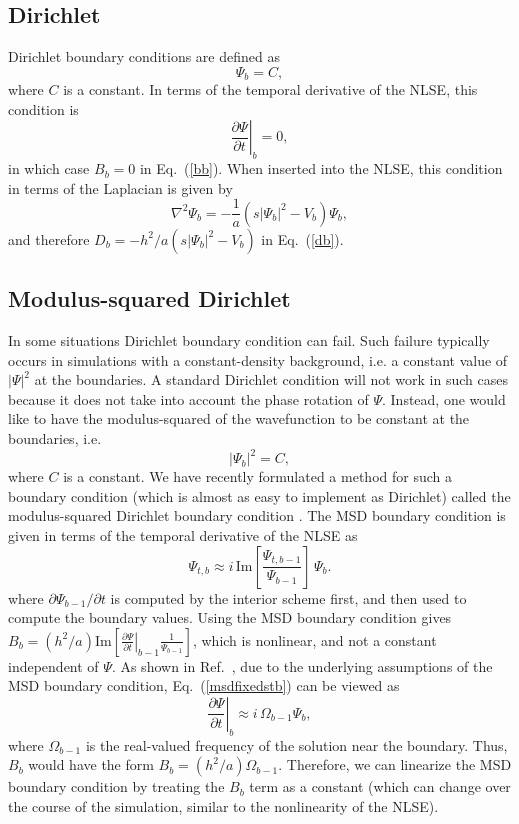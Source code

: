 \documentclass{article}
\begin{document}
\subsection{Dirichlet}
Dirichlet boundary conditions are defined as
\[
\Psi_b = C,
\]
where $C$ is a constant.  In terms of the temporal derivative of the NLSE, this condition is
\[
\left. \frac{\partial \Psi}{\partial t}\right|_b = 0,
\] 
in which case $B_b = 0$ in Eq.~(\ref{bb}).  When inserted into the NLSE, this condition in terms of the Laplacian is given by
\[
\nabla^2\Psi_b = -\frac{1}{a} (s|\Psi_b|^2 - V_b) \Psi_b,
\]
and therefore $D_b=-h^2/a (s|\Psi_b|^2 - V_b)$ in Eq.~(\ref{db}).

\subsection{Modulus-squared Dirichlet}
In some situations Dirichlet boundary condition can fail.  Such failure typically occurs in  simulations with a constant-density background, i.e. a constant value of $|\Psi|^2$ at the boundaries.  A standard Dirichlet condition will not work in such cases because it does not take into account the phase rotation of $\Psi$.  Instead, one would like to have the modulus-squared of the wavefunction to be constant at the boundaries, i.e. 
\[
|\Psi_b|^2 = C,
\]
where $C$ is a constant.  We have recently formulated a method for such a boundary condition (which is almost as easy to implement as Dirichlet) called the modulus-squared Dirichlet boundary condition \cite{ME_MSD}.  The MSD boundary condition is given in terms of the temporal derivative of the NLSE as
\begin{equation}
\label{msdfixedstb}
\Psi_{t,b} \approx i\,\mbox{Im}\left[\frac{\Psi_{t,b-1}}{\Psi_{b-1}}\right]\,\Psi_b.
\end{equation}
where $\partial \Psi_{b-1}/\partial t$ is computed by the interior scheme first, and then used to compute the boundary values.  Using the MSD boundary condition gives $B_b = (h^2/a)\mbox{Im}\left[\left.\frac{\partial \Psi}{\partial t}\right|_{b-1}\frac{1}{\Psi_{b-1}}\right]$, which is nonlinear, and not a constant independent of $\Psi$.  As shown in Ref.~\cite{ME_MSD}, due to the underlying assumptions of the MSD boundary condition, Eq.~(\ref{msdfixedstb}) can be viewed as  
\[
\left. \frac{\partial \Psi}{\partial t}\right|_b \approx i\,\Omega_{b-1} \Psi_b,
\]
where $\Omega_{b-1}$ is the real-valued frequency of the solution near the boundary.  Thus, $B_b$ would have the form $B_b = (h^2/a)\Omega_{b-1}$.  Therefore, we can linearize the MSD boundary condition by treating the $B_b$ term as a constant (which can change over the course of the simulation, similar to the nonlinearity of the NLSE).
\end{document}
